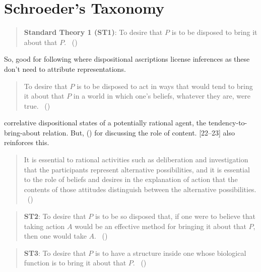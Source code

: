 \documentclass[10pt]{article}
\begin{document}
\section{Schroeder's Taxonomy}
\label{sec:schroeders-taxonomy}

\begin{quote}
  \textbf{Standard Theory 1 (ST1)}:
  To desire that \(P\) is to be disposed to bring it about that \(P\).\nolinebreak
  \mbox{ }\hfill(\citeyear[11]{Schroeder:2004aa})
\end{quote}

So, good for following \citeauthor{Ryle:1949aa} where dispositional ascriptions license inferences as these don't need to attribute representations.

\begin{quote}
  To desire that \(P\) is to be disposed to act in ways that would tend to bring it about that \(P\) in a world in which one's beliefs, whatever they are, were true.\nolinebreak
  \mbox{ }\hfill(\citeyear[15]{Stalnaker:1984aa})
\end{quote}
{\color{red} correlative dispositional states of a potentially rational agent, the tendency-to-bring-about relation. But, (\citeyear[18]{Stalnaker:1984aa}) for \citeauthor{Stalnaker:1984aa} discussing the role of content. [22--23] also reinforces this.
    \begin{quote}
      It is essential to rational activities such as deliberation and investigation that the participants represent alternative possibilities, and it is essential to the role of beliefs and desires in the explanation of action that the contents of those attitudes distinguish between the alternative possibilities.\nolinebreak
      \mbox{ }\hfill(\citeyear[23]{Stalnaker:1984aa})
    \end{quote}
  }
  
\begin{quote}
  \textbf{ST2}:
  To desire that \(P\) is to be so disposed that, if one were to believe that taking action \(A\) would be an effective method for bringing it about that \(P\), then one would take \(A\).\nolinebreak
  \mbox{ }\hfill(\citeyear[17]{Schroeder:2004aa})
\end{quote}

\begin{quote}
  \textbf{ST3}:
  To desire that \(P\) is to have a structure inside one whose biological function is to bring it about that \(P\).\nolinebreak
  \mbox{ }\hfill(\citeyear[18]{Schroeder:2004aa})
\end{quote}
\end{document}
